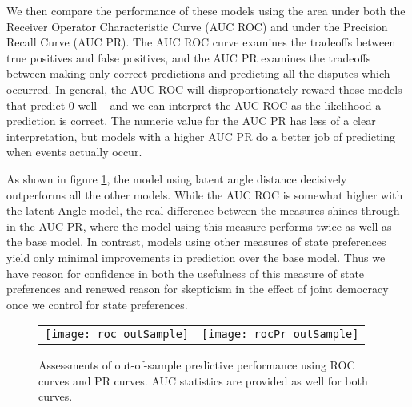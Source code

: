 We then compare the performance of these models using the area under both the Receiver Operator Characteristic Curve (AUC ROC) and under the Precision Recall Curve (AUC PR). The AUC ROC curve examines the tradeoffs between true positives and false positives, and the AUC PR examines the tradeoffs between making only correct predictions and predicting all the disputes which occurred. In general, the AUC ROC will disproportionately reward those models that predict $0$ well -- and we can interpret the AUC ROC as the likelihood a prediction is correct. The numeric value for the AUC PR has less of a clear interpretation, but models with a higher AUC PR do a better job of predicting when events actually occur.

As shown in figure \ref{fig:roc}, the model using latent angle distance decisively outperforms all the other models. While the AUC ROC is somewhat higher with the latent Angle model, the real difference between the measures shines through in the AUC PR, where the model using this measure performs twice as well as the base model. In contrast, models using other measures of state preferences yield only minimal improvements in prediction over the base model. Thus we have reason for confidence in both the usefulness of this measure of state preferences and renewed reason for skepticism in the effect of joint democracy once we control for state preferences. 

\begin{figure}[ht]
	\centering
	\begin{tabular}{cc}
	\texttt{[image: roc\_outSample]} & 
	\texttt{[image: rocPr\_outSample]}	
	\end{tabular}
	\caption{Assessments of out-of-sample predictive performance using ROC curves and PR curves. AUC statistics are provided as well for both curves.}
	\label{fig:roc}
\end{figure}
\FloatBarrier
